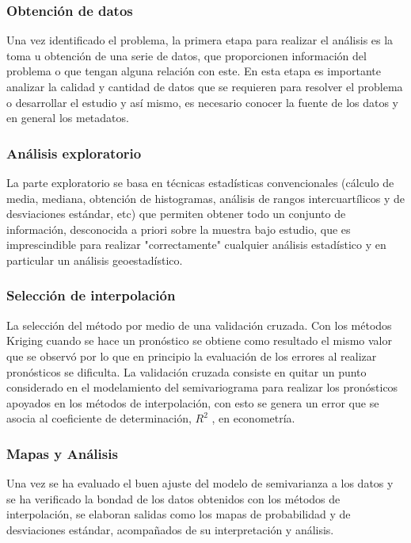 \subsubsection{Obtención de datos}
Una vez identificado el problema, la primera etapa para realizar el análisis es la toma u
obtención de una serie de datos, que proporcionen información del problema o que tengan
alguna relación con este. En esta etapa es importante analizar la calidad y cantidad de datos
que se requieren para resolver el problema o desarrollar el estudio y así mismo, es necesario
conocer la fuente de los datos y en general los metadatos. 

\subsubsection{Análisis exploratorio}

La parte exploratorio se basa en técnicas estadísticas convencionales (cálculo de media, mediana, obtención de histogramas, análisis de rangos intercuartílicos y de desviaciones estándar, etc) que permiten obtener todo un conjunto de información, desconocida a priori sobre la muestra bajo estudio, que es imprescindible para realizar "correctamente" cualquier análisis estadístico y en particular un análisis geoestadístico.  \cite{notas_clase2}





\subsubsection{Selección de interpolación}
La selección del
método por medio de una validación cruzada. Con los métodos Kriging cuando se hace un pronóstico se obtiene como resultado el mismo
valor que se observó por lo que en principio la evaluación de los errores al realizar
pronósticos se dificulta.
La validación cruzada consiste en quitar un punto considerado en el modelamiento del
semivariograma para realizar los pronósticos apoyados en los métodos de interpolación,
con esto se genera un error que se asocia al coeficiente de determinación, $R^2$ , en
econometría. 

\subsubsection{Mapas y Análisis}

Una vez se ha evaluado el buen ajuste del modelo de semivarianza a los datos y se ha
verificado la bondad de los datos obtenidos con los métodos de interpolación, se elaboran salidas como los mapas de probabilidad y de desviaciones estándar, acompañados de su interpretación y análisis.




